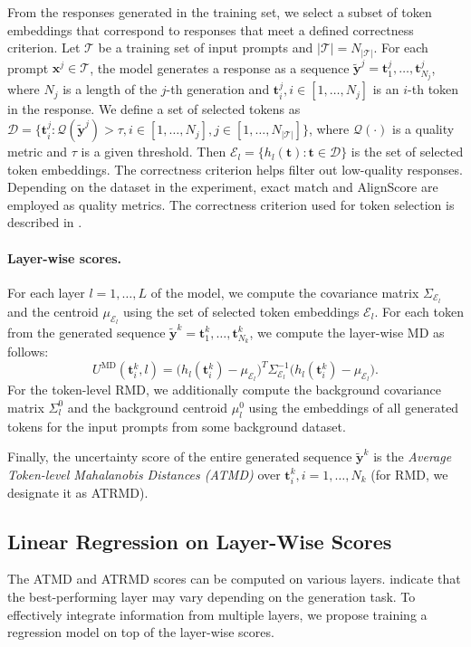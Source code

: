 \documentclass[11pt]{article}
\newcommand{\xv}{\mathbf{x}}
\newcommand{\tv}{\mathbf{t}}
\newcommand{\yv}{\mathbf{y}}
\newcommand{\TC}{\mathcal{T}}
\newcommand{\EC}{\mathcal{E}}
\newcommand{\QC}{\mathcal{Q}}
\newcommand{\DC}{\mathcal{D}}
\begin{document}
  From the responses generated in the training set, we select a subset of token embeddings that correspond to responses that meet a defined correctness criterion. Let $\TC$ be a training set of input prompts and $|\TC| = N_{|\TC|}$. For each prompt $\xv^j \in \TC$, the model generates a response as a sequence $\tilde{\yv}^j = \tv^j_1, \dots, \tv^j_{N_j}$, where $N_j$ is a length of the $j$-th generation and $\tv^j_i, i\in[1, \dots, N_j]$ is an $i$-th token in the response. We define a set of selected tokens as $\DC = \{\tv^j_i\colon\QC(\tilde{\yv}^j) > \tau, i\in[1, \dots, N_j], j\in[1, \dots, N_{|\TC|}] \}$, where $\QC(\cdot)$ is a quality metric and $\tau$ is a given threshold. Then $\EC_l = \{h_l(\tv)\colon\tv\in\DC\}$ is the set of selected token embeddings. The correctness criterion helps filter out low-quality responses. Depending on the dataset in the experiment, exact match and AlignScore are employed as quality metrics. The correctness criterion used for token selection is described in . 

\paragraph{Layer-wise scores.}
  For each layer $l=1, \dots, L$ of the model, we compute the covariance matrix $\Sigma_{\EC_l}$ and the centroid $\mu_{\EC_l}$ using the set of selected token embeddings $\EC_l$. For each token from the generated sequence $\tilde{\yv}^k = \tv^k_1, \dots, \tv^k_{N_k}$, we compute the layer-wise MD as follows:
  \begin{equation*}
    U^{\text{MD}}(\tv^k_i, l) \!=\! \bigl(h_l(\tv^k_i) - \mu_{\EC_l}\bigr)^{T} \Sigma_{\EC_l}^{-1} \bigl(h_l(\tv^k_i) - \mu_{\EC_l}\bigr).
  \end{equation*}
  For the token-level RMD, we additionally compute the background covariance matrix $\Sigma^0_l$ and the background centroid $\mu^0_l$ using the embeddings of all generated tokens for the input prompts from some background dataset. 

  Finally, the uncertainty score of the entire generated sequence $\tilde{\yv}^k$ is the \textit{Average Token-level Mahalanobis Distances (ATMD)} over $\tv^k_i, i=1, \dots, N_k$ (for RMD, we designate it as ATRMD).

\subsection{Linear Regression on Layer-Wise Scores}
\label{sec:supervised}
  The ATMD and ATRMD scores can be computed on various layers. \citet{azaria-mitchell-2023-internal} indicate that the best-performing layer may vary depending on the generation task. To effectively integrate information from multiple layers, we propose training a regression model on top of the layer-wise scores.
\end{document}
